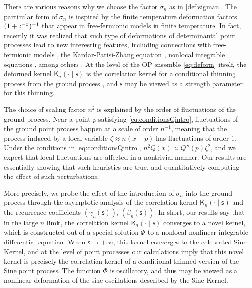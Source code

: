 \documentclass[reqno,a4paper,11pt]{amsart}
\DeclareMathOperator{\ee}{\rm e}
\newcommand{\msf}{\mathsf}
\newcommand{\sad}{\msf s}
\theoremstyle{definition}
\theoremstyle{remark}
\numberwithin{equation}{section}
\begin{document}
There are various reasons why we choose the factor $\sigma_n$ as in \eqref{def:sigman}.
The particular form of $\sigma_n$ is inspired by the finite temperature deformation factors $(1+\ee^{-x})^{-1}$ that appear in free-fermionic models in finite temperature. In fact, recently it was realized that such type of deformations of determinantal point processes lead to new interesting features, including connections with free-fermionic models \cite{Dean2015}, the Kardar-Parisi-Zhang equation \cite{GhosalSilva22, AmirCorwinQuastel2011}, nonlocal integrable equations \cite{BothnerCafassoTarricone2021, CafassoClaeysRuzza2021}, among others \cite{Johansson2007, Liechty2020}. At the level of the OP ensemble \eqref{eq:deform} itself, the deformed kernel $\msf K_n(\cdot\mid \sad)$ is the correlation kernel for a conditional thinning process from the ground process \cite{ClaeysGlesner2021}, and $\sad$ may be viewed as a strength parameter for this thinning.

The choice of scaling factor $n^2$ is explained by the order of fluctuations of the ground process. Near a point $p$ satisfying \eqref{eq:conditionsQintro}, fluctuations of the ground point process happen at a scale of order $n^{-1}$, meaning that the process induced by a local variable $\zeta\approx n(x-p)$ has fluctuations of order $1$. Under the conditions in \eqref{eq:conditionsQintro}, $n^2 Q(x)\approx Q''(p)\zeta^2$, and we expect that local fluctuations are affected in a nontrivial manner. Our results are essentially showing that such heuristics are true, and quantitatively computing the effect of such perturbations.

More precisely, we probe the effect of the introduction of $\sigma_n$ into the ground process through the asymptotic analysis of the correlation kernel $\msf K_n(\cdot\mid \sad)$ and the recurrence coefficients $(\gamma_n(\sad))$, $(\beta_n(\sad))$. In short, our results say that in the large $n$ limit, the correlation kernel $\msf K_n(\cdot\mid \sad)$ converges to a novel kernel, which is constructed out of a special solution $\msf \Phi$ to a nonlocal nonlinear integrable differential equation. When $\sad \to +\infty$, this kernel converges to the celebrated Sine Kernel, and at the level of point processes our calculations imply that this novel kernel is precisely the correlation kernel of a conditional thinned version of the Sine point process. The function $\msf \Phi$ is oscillatory, and thus may be viewed as a nonlinear deformation of the sine oscillations described by the Sine Kernel.
\end{document}
